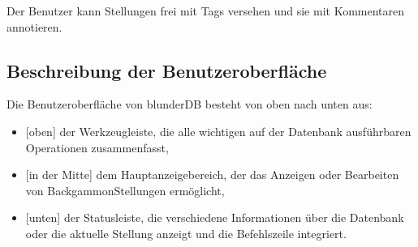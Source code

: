 \documentclass[letterpaper,10pt,german]{sphinxmanual}
\begin{document}
\sphinxAtStartPar
Der Benutzer kann Stellungen frei mit Tags versehen und sie mit Kommentaren annotieren.


\subsection{Beschreibung der Benutzeroberfläche}
\label{\detokenize{manuel:description-de-l-interface}}
\sphinxAtStartPar
Die Benutzeroberfläche von blunderDB besteht von oben nach unten aus:
\begin{itemize}
\item {} 
\sphinxAtStartPar
{[}oben{]} der Werkzeugleiste, die alle wichtigen auf der Datenbank ausführbaren Operationen zusammenfasst,

\item {} 
\sphinxAtStartPar
{[}in der Mitte{]} dem Hauptanzeigebereich, der das Anzeigen oder Bearbeiten von Backgammon\sphinxhyphen{}Stellungen ermöglicht,

\item {} 
\sphinxAtStartPar
{[}unten{]} der Statusleiste, die verschiedene Informationen über die Datenbank oder die aktuelle Stellung anzeigt und die Befehlszeile integriert.

\end{itemize}
\end{document}
